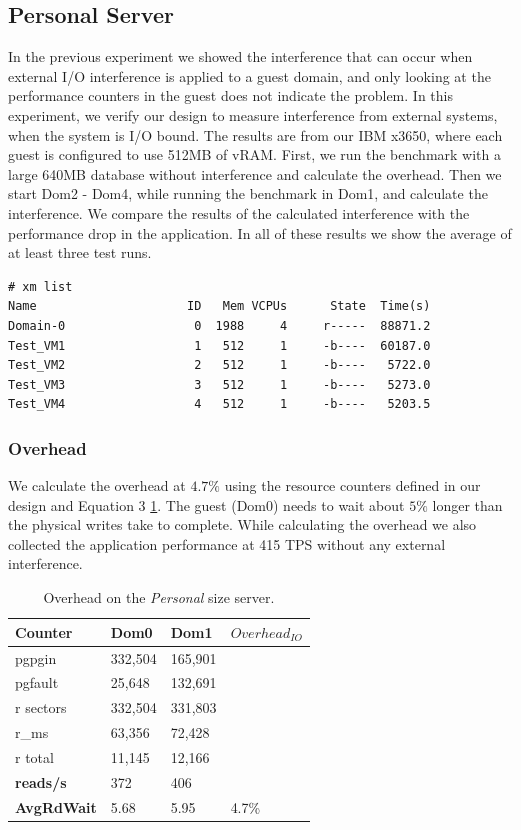 \subsection{Personal Server}
In the previous experiment we showed the interference that can occur when external I/O interference is applied to a guest domain, and only looking at the performance counters in the guest does not indicate the problem.  In this experiment, we verify our design to measure interference from external systems, when the system is I/O bound.  The results are from our IBM x3650, where each guest is configured to use 512MB of vRAM.  First, we run the benchmark with a large 640MB database without interference and calculate the overhead.  Then we start Dom2 - Dom4, while running the benchmark in Dom1, and calculate the interference.  We compare the results of the calculated interference with the performance drop in the application.  In all of these results we show the average of at least three test runs.

\begingroup
    \fontsize{10pt}{12pt}\selectfont
\begin{Verbatim}
# xm list
Name                     ID   Mem VCPUs      State  Time(s)
Domain-0                  0  1988     4     r-----  88871.2
Test_VM1                  1   512     1     -b----  60187.0
Test_VM2                  2   512     1     -b----   5722.0
Test_VM3                  3   512     1     -b----   5273.0
Test_VM4                  4   512     1     -b----   5203.5
\end{Verbatim}
\endgroup

\subsubsection{Overhead}
We calculate the overhead at $4.7\%$ using the resource counters defined in our design and Equation 3 \ref{tab:OverheadSmall}.  The guest (Dom0) needs to wait about $5\%$ longer than the physical writes take to complete.  While calculating the overhead we also collected the application performance at 415 TPS without any external interference.

\begin{table}[h]
\begin{tabular}{ l l l p{5cm} }
  Counter     & Dom0 & Dom1 & $Overhead_{IO}$ \\
  \hline
	pgpgin    & 332,504 & 165,901  &  \\
	pgfault   &  25,648 & 132,691  & \\
	r sectors & 332,504 & 331,803  &\\
	r\_ms     &  63,356 &  72,428  & \\
	r total   &  11,145 &  12,166  & \\
    \textbf{reads/s}    & 372 & 406 & \\
    \textbf{AvgRdWait}  & 5.68 & 5.95 & 4.7\% \\ 
  \hline
\end{tabular}
\caption{Overhead on the \emph{Personal} size server.}
\label{tab:OverheadSmall}
\end{table}

